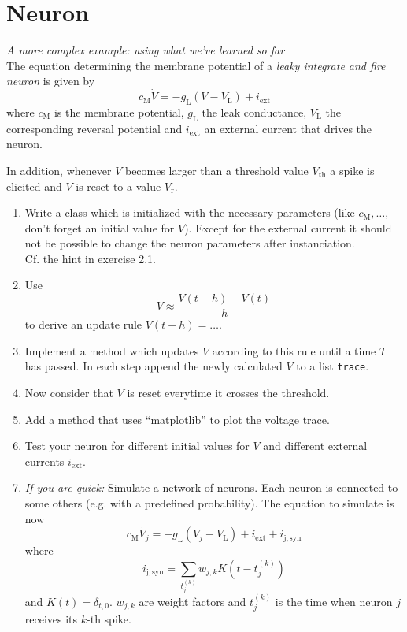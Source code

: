 \documentclass[12pt]{article}
\newcommand{\ind}[1]{_{\mathrm{#1}}}
\begin{document}
\section{Neuron}
\textit{A more complex example: using what we've learned so far}\\
The equation determining the membrane potential of a \emph{leaky integrate and fire neuron} is given by 
\[c\ind{M}\dot{V}=-g\ind{L}\left(V-V\ind{L}\right)+i\ind{ext}\]
where $c\ind{M}$ is the membrane potential, $g\ind{L}$ the leak conductance, $V\ind{L}$ the corresponding reversal potential and $i\ind{ext}$ an external current that drives the neuron.

In addition, whenever $V$ becomes larger than a threshold value $V\ind{th}$ a spike is elicited and $V$ is reset to a value $V\ind{r}$.
\begin{enumerate}
\item Write a class which is initialized with the necessary parameters (like $c\ind{M},\dots$, don't forget an initial value for $V$). Except for the external current it should not be possible to change the neuron parameters after instanciation.\\
Cf. the hint in exercise 2.1.
\item Use 
\[ \dot{V}\approx\frac{V(t+h)-V(t)}{h}\]
 to derive an update rule $V(t+h)=\dots$.
\item Implement a method which updates $V$ according to this rule until a time $T$ has passed. In each step append the newly calculated $V$ to a list \texttt{trace}.
\item Now consider that $V$ is reset everytime it crosses the threshold.
\item Add a method that uses ``matplotlib'' to plot the voltage trace.
\item Test your neuron for different initial values for $V$ and different
  external currents $i\ind{ext}$.
\item \emph{If you are quick:} Simulate a network of neurons. Each neuron is
  connected to some others (e.g. with a predefined probability). The equation
  to simulate is now 
\[c\ind{M}\dot{V_j}=-g\ind{L}\left(V_j-V\ind{L}\right)+i\ind{ext} + i\ind{j,syn}\]
where 
\[i\ind{j,syn} = \sum\limits_{t_j^{(k)}} w_{j,k} K(t-t_j^{(k)})\]
and $K(t)=\delta_{t,0}$. $w_{j,k}$ are weight factors and $t_j^{(k)}$ is the time when neuron $j$ receives its $k$-th spike.
  
\end{enumerate}
\end{document}
